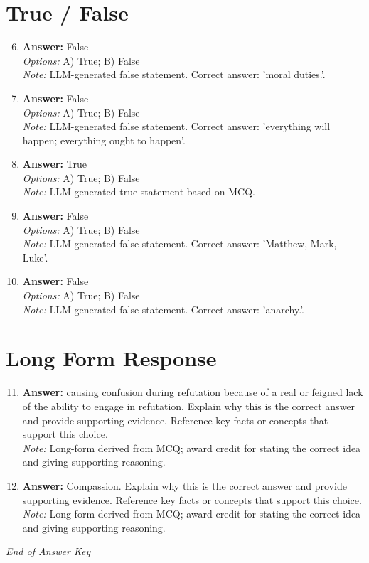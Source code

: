 \documentclass[12pt]{article}
\begin{document}
\section*{True / False}
\begin{enumerate}[label=\arabic*.]
\setcounter{enumi}{5}
\item \textbf{Answer:} False
\\ \textit{Options:} A) True; B) False
\\ \textit{Note:} LLM-generated false statement. Correct answer: 'moral duties.'.
\item \textbf{Answer:} False
\\ \textit{Options:} A) True; B) False
\\ \textit{Note:} LLM-generated false statement. Correct answer: 'everything will happen; everything ought to happen'.
\item \textbf{Answer:} True
\\ \textit{Options:} A) True; B) False
\\ \textit{Note:} LLM-generated true statement based on MCQ.
\item \textbf{Answer:} False
\\ \textit{Options:} A) True; B) False
\\ \textit{Note:} LLM-generated false statement. Correct answer: 'Matthew, Mark, Luke'.
\item \textbf{Answer:} False
\\ \textit{Options:} A) True; B) False
\\ \textit{Note:} LLM-generated false statement. Correct answer: 'anarchy.'.
\end{enumerate}

\section*{Long Form Response}
\begin{enumerate}[label=\arabic*.]
\setcounter{enumi}{10}
\item \textbf{Answer:} causing confusion during refutation because of a real or feigned lack of the ability to engage in refutation. Explain why this is the correct answer and provide supporting evidence. Reference key facts or concepts that support this choice.
\\ \textit{Note:} Long-form derived from MCQ; award credit for stating the correct idea and giving supporting reasoning.
\item \textbf{Answer:} Compassion. Explain why this is the correct answer and provide supporting evidence. Reference key facts or concepts that support this choice.
\\ \textit{Note:} Long-form derived from MCQ; award credit for stating the correct idea and giving supporting reasoning.
\end{enumerate}

\vfill
\noindent\textit{End of Answer Key}
\end{document}
